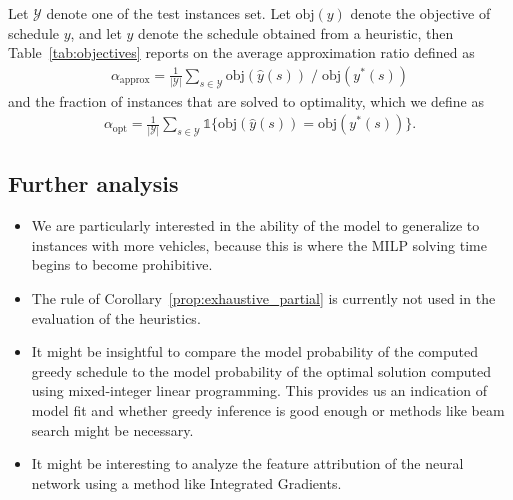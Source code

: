 \documentclass[a4paper]{article}
\theoremstyle{definition}
\theoremstyle{plain}
\begin{document}
Let $\mathcal{Y}$ denote one of the test instances set. Let $\text{obj}(y)$
denote the objective of schedule $y$, and let $\hat{y}$ denote the schedule
obtained from a heuristic, then Table~\ref{tab:objectives} reports on the
average approximation ratio defined as
\begin{align*}
  \alpha_{\text{approx}} = \frac{1}{|\mathcal{Y}|} \sum_{s \in \mathcal{Y}} \text{obj}(\hat{y}(s)) \; / \; \text{obj}(y^{*}(s))
\end{align*}
and the fraction of instances that are solved to optimality, which
we define as
\begin{align*}
  \alpha_{\text{opt}} = \frac{1}{|\mathcal{Y}|} \sum_{s \in \mathcal{Y}} \mathds{1}\{ \text{obj}(\hat{y}(s)) = \text{obj}(y^{*}(s)) \} .
\end{align*}




{\color{blue}
\subsection*{Further analysis}

\begin{itemize}
  \item We are particularly interested in the ability of the model to generalize
        to instances with more vehicles, because this is where the MILP solving
        time begins to become prohibitive.

  \item The rule of Corollary~\ref{prop:exhaustive_partial} is currently not
        used in the evaluation of the heuristics.

  \item It might be insightful to compare the model probability of the computed
        greedy schedule to the model probability of the optimal solution
        computed using mixed-integer linear programming. This provides us an
        indication of model fit and whether greedy inference is good enough or
        methods like beam search might be necessary.

  \item It might be interesting to analyze the feature attribution of the neural
        network using a method like Integrated Gradients.
\end{itemize}
}

\newpage
\end{document}
